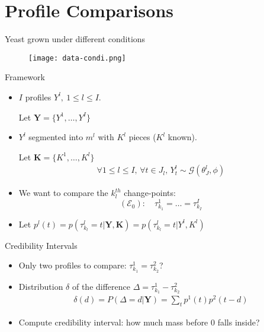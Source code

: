 \documentclass[a4paper]{beamer}
\begin{document}
\section{Profile Comparisons}

\begin{frame}{Yeast grown under different conditions}
 \begin{figure}
  \texttt{[image: data-condi.png]}
 \end{figure}
\end{frame}

\begin{frame}{Framework}
  \begin{itemize}
  	\item $I$ profiles $Y^l,\ 1\leq l\leq I.$ 
  	
  	Let $\mathbf{Y}=\{Y^1,\dots,Y^I\}$
  	\item $Y^l$ segmented into  $m^l$ with $K^l$ pieces ($K^l$ known). 
  	
  	Let $\mathbf{K}=\{K^1,\dots,K^l\}$
		\begin{eqnarray*}
			\forall 1\leq l\leq I, \, \forall t \in J_l, \, Y_t^l \sim \mathcal{G}(\theta_J^l,\phi)
		\end{eqnarray*}
		\item We want to compare the $k_l^{th}$ change-points: 
		$$\left(\mathcal{E}_0\right): \quad \tau_{k_1}^1=\dots=\tau_{k_I}^I  $$
		\item Let  $p^l(t)=p(\tau_{k_l}^l=t|\mathbf{Y},\mathbf{K})=p(\tau_{k_l}^l=t|Y^l,K^l)$
  \end{itemize}
\end{frame}

\begin{frame}{Credibility Intervals}
  \begin{itemize}
  	\item Only two profiles to compare: $\tau_{k_1}^1=\tau_{k_2}^2$?
  	\item Distribution $\delta$ of the difference $\Delta =  \tau_{k_1}^1-\tau_{k_2}^2$ 
		\begin{eqnarray*}
			\delta(d)=P(\Delta=d|\mathbf{Y}) =\sum_t p^1(t) p^2(t-d)
		\end{eqnarray*} 
		\item Compute credibility interval: how much mass before $0$ falls inside?
  \end{itemize}
\end{frame}
\end{document}
